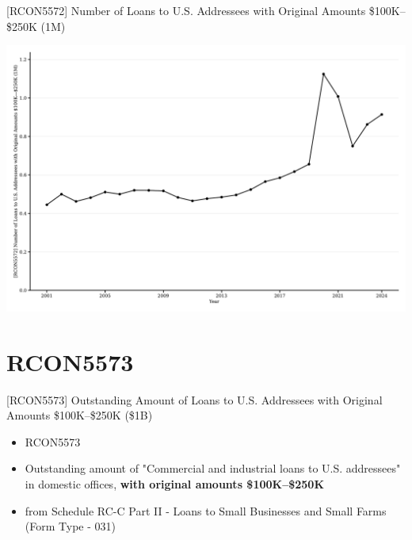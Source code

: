 \documentclass{beamer}
\begin{document}
\begin{frame}{[RCON5572] Number of Loans to U.S. Addressees with Original Amounts \$100K–\$250K (1M)}
\begin{center}
\includegraphics[width=1\textwidth]{figures/Figure_RCON5572_Num_Loans_100K_250K.pdf}
\end{center}
\end{frame}


\section{RCON5573}

\begin{frame}{[RCON5573] Outstanding Amount of Loans to U.S. Addressees with Original Amounts \$100K–\$250K (\$1B)}
\begin{itemize}
    \item RCON5573
    \item Outstanding amount of "Commercial and industrial loans to U.S. addressees" in domestic offices, \textbf{with original amounts \$100K–\$250K}
    \item from Schedule RC-C Part II - Loans to Small Businesses and Small Farms (Form Type - 031)
\end{itemize}
\end{frame}
\end{document}
